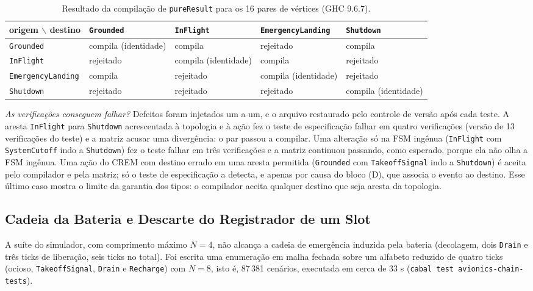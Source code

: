 \documentclass[12pt,a4paper]{article}
\begin{document}
\begin{table}[h]
\centering
\scriptsize
\begin{tabular}{|p{3.0cm}|p{2.5cm}|p{2.3cm}|p{3.0cm}|p{2.5cm}|}
\hline
origem $\backslash$ destino & \texttt{Grounded} & \texttt{InFlight} & \texttt{EmergencyLanding} & \texttt{Shutdown} \\
\hline
\texttt{Grounded} & compila (identidade) & compila & rejeitado & compila \\
\hline
\texttt{InFlight} & rejeitado & compila (identidade) & compila & rejeitado \\
\hline
\texttt{EmergencyLanding} & compila & rejeitado & compila (identidade) & rejeitado \\
\hline
\texttt{Shutdown} & rejeitado & rejeitado & rejeitado & compila (identidade) \\
\hline
\end{tabular}
\caption{Resultado da compilação de \texttt{pureResult} para os 16 pares de vértices (GHC 9.6.7).}
\end{table}

\textit{As verificações conseguem falhar?} Defeitos foram injetados um a um, e o arquivo restaurado pelo controle de versão após cada teste. A aresta \texttt{InFlight} para \texttt{Shutdown} acrescentada à topologia e à ação fez o teste de especificação falhar em quatro verificações (versão de 13 verificações do teste) e a matriz acusar uma divergência: o par passou a compilar. Uma alteração só na FSM ingênua (\texttt{InFlight} com \texttt{SystemCutoff} indo a \texttt{Shutdown}) fez o teste falhar em três verificações e a matriz continuou passando, como esperado, porque ela não olha a FSM ingênua. Uma ação do CREM com destino errado em uma aresta permitida (\texttt{Grounded} com \texttt{TakeoffSignal} indo a \texttt{Shutdown}) é aceita pelo compilador e pela matriz; só o teste de especificação a detecta, e apenas por causa do bloco (D), que associa o evento ao destino. Esse último caso mostra o limite da garantia dos tipos: o compilador aceita qualquer destino que seja aresta da topologia.

\subsection{Cadeia da Bateria e Descarte do Registrador de um Slot}

A suíte do simulador, com comprimento máximo $N = 4$, não alcança a cadeia de emergência induzida pela bateria (decolagem, dois \texttt{Drain} e três ticks de liberação, seis ticks no total). Foi escrita uma enumeração em malha fechada sobre um alfabeto reduzido de quatro ticks (ocioso, \texttt{TakeoffSignal}, \texttt{Drain} e \texttt{Recharge}) com $N = 8$, isto é, 87\,381 cenários, executada em cerca de 33 s (\texttt{cabal test avionics-chain-tests}).
\end{document}
